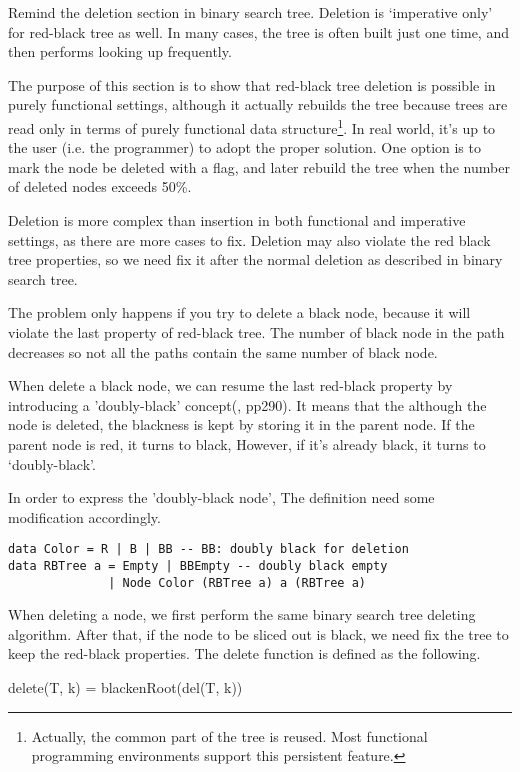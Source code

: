 \documentclass[b5paper]{article}
\begin{document}
Remind the deletion section in binary search tree. Deletion is
`imperative only' for red-black tree as well. In many cases,
the tree is often built just one time, and then
performs looking up frequently\cite{okasaki-blog}.

The purpose of this section is to show that red-black
tree deletion is possible in purely functional settings,
although it actually rebuilds the tree because trees are
read only in terms of purely functional data structure\footnote{Actually, the common part of the tree is reused. Most functional programming environments support this persistent feature.}.
In real world, it's up to the user (i.e. the
programmer) to adopt the proper solution. One option is to mark
the node be deleted with a flag, and later rebuild the tree
when the number of deleted nodes exceeds 50\%.

Deletion is more complex than insertion in both functional and
imperative settings, as there are more cases to fix.
Deletion may also violate the red black tree properties,
so we need fix it after the normal deletion as described
in binary search tree.

The problem only happens if you try to
delete a black node, because it will violate the last property
of red-black tree. The number of black
node in the path decreases so not all the paths contain the
same number of black node.

When delete a black node, we can resume the last red-black property
by introducing a 'doubly-black' concept(\cite{CLRS}, pp290). It means
that the although the node is deleted, the blackness is kept
by storing it in the parent node. If the parent node is red,
it turns to black, However, if it's already black, it
turns to `doubly-black'.

In order to express the 'doubly-black node', The definition
need some modification accordingly.

\lstset{language=Haskell}
\begin{lstlisting}
data Color = R | B | BB -- BB: doubly black for deletion
data RBTree a = Empty | BBEmpty -- doubly black empty
              | Node Color (RBTree a) a (RBTree a)
\end{lstlisting}

When deleting a node, we first perform the same binary search tree deleting
algorithm. After that, if the node to be sliced out is black, we
need fix the tree to keep the red-black properties. The
delete function is defined as the following.

\be
delete(T, k) = blackenRoot(del(T, k))
\ee
\end{document}
